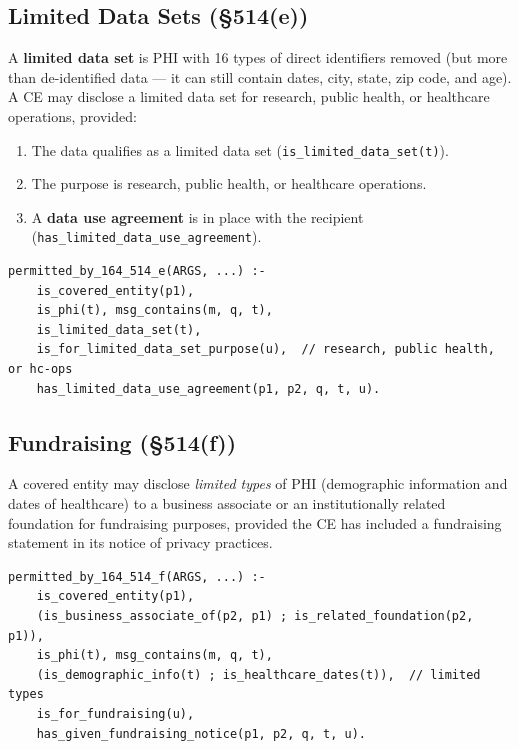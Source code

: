 \documentclass[11pt,letterpaper]{article}
\begin{document}
\subsection{Limited Data Sets (\S 514(e))}

A \textbf{limited data set} is PHI with 16 types of direct identifiers removed (but more than de-identified data --- it can still contain dates, city, state, zip code, and age). A CE may disclose a limited data set for research, public health, or healthcare operations, provided:

\begin{enumerate}
  \item The data qualifies as a limited data set (\texttt{is\_limited\_data\_set(t)}).
  \item The purpose is research, public health, or healthcare operations.
  \item A \textbf{data use agreement} is in place with the recipient (\texttt{has\_limited\_data\_use\_agreement}).
\end{enumerate}

\begin{lstlisting}[style=soufflestyle,caption={Limited data set disclosure (\S 514(e))}]
permitted_by_164_514_e(ARGS, ...) :-
    is_covered_entity(p1),
    is_phi(t), msg_contains(m, q, t),
    is_limited_data_set(t),
    is_for_limited_data_set_purpose(u),  // research, public health, or hc-ops
    has_limited_data_use_agreement(p1, p2, q, t, u).
\end{lstlisting}

\subsection{Fundraising (\S 514(f))}

A covered entity may disclose \emph{limited types} of PHI (demographic information and dates of healthcare) to a business associate or an institutionally related foundation for fundraising purposes, provided the CE has included a fundraising statement in its notice of privacy practices.

\begin{lstlisting}[style=soufflestyle,caption={Fundraising disclosure (\S 514(f))}]
permitted_by_164_514_f(ARGS, ...) :-
    is_covered_entity(p1),
    (is_business_associate_of(p2, p1) ; is_related_foundation(p2, p1)),
    is_phi(t), msg_contains(m, q, t),
    (is_demographic_info(t) ; is_healthcare_dates(t)),  // limited types
    is_for_fundraising(u),
    has_given_fundraising_notice(p1, p2, q, t, u).
\end{lstlisting}
\end{document}
